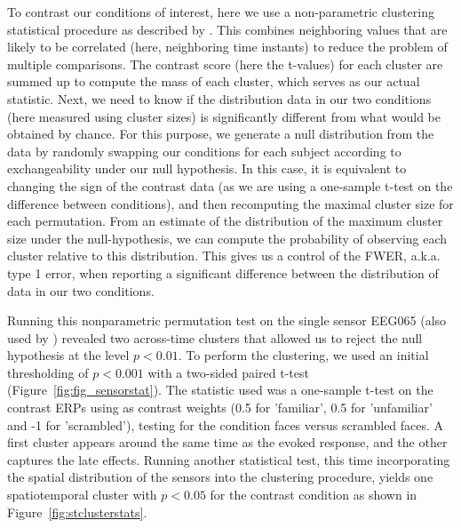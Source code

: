 To contrast our conditions of interest, here we use a non-parametric clustering statistical procedure as described by \cite{maris_nonparametric_2007}. This combines neighboring values that are likely to be correlated (here, neighboring time instants) to reduce the problem of multiple comparisons. The contrast score (here the  t-values) for each cluster are summed up to compute the mass of each cluster, which serves as our actual statistic. Next, we need to know if the distribution data in our two conditions (here measured using cluster sizes) is significantly different from what would be obtained by chance. For this purpose, we generate a null distribution from the data by randomly swapping our conditions for each subject according to exchangeability under our null hypothesis. In this case, it is equivalent to changing the sign of the contrast data (as we are using a one-sample t-test on the difference between conditions), and then recomputing the maximal cluster size for each permutation. From an estimate of the distribution of the maximum cluster size under the null-hypothesis, we can compute the probability of observing each cluster relative to this distribution. This gives us a control of the \ac{FWER}, a.k.a. type 1 error, when reporting a significant difference between the distribution of data in our two conditions.

Running this nonparametric permutation test on the single sensor EEG065 (also used by \cite{wakeman2015multi}) revealed two across-time clusters that allowed us to reject the null hypothesis at the level $p < 0.01$. To perform the clustering, we used an initial thresholding of $p < 0.001$ with a two-sided paired t-test (Figure~\ref{fig:fig_sensorstat}). The statistic used was a one-sample t-test on the contrast ERPs using as contrast weights (0.5 for 'familiar', 0.5 for 'unfamiliar' and -1 for 'scrambled'), testing for the condition faces versus scrambled faces. A first cluster appears around the same time as the evoked response, and the other captures the late effects. Running another statistical test, this time incorporating the spatial distribution of the sensors into the clustering procedure, yields one spatiotemporal cluster with $p < 0.05$ for the contrast condition as shown in Figure~\ref{fig:stclusterstats}.

